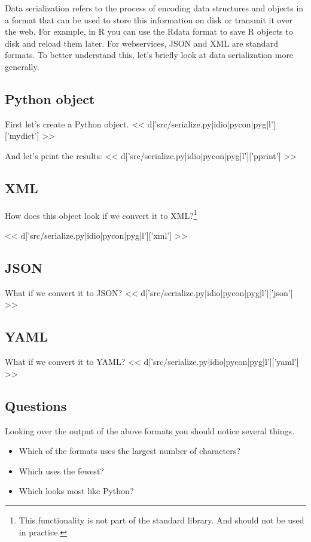 Data serialization refers to the process of encoding data structures and
objects in a format that can be used to store this information on disk or
transmit it over the web.  For example, in R you can use the Rdata format to
save R objects to disk and reload them later.  For webservices, JSON and XML
are standard formats.  To better understand this, let's briefly look at data
serialization more generally.

\subsection*{Python object}
First let's create a Python object.
<< d['src/serialize.py|idio|pycon|pyg|l']['mydict'] >>

And let's print the results:
<< d['src/serialize.py|idio|pycon|pyg|l']['pprint'] >>

\subsection*{XML}

How does this object look if we convert it to XML?\footnote{This functionality
is not part of the standard library.  And should not be used in practice.}

<< d['src/serialize.py|idio|pycon|pyg|l']['xml'] >>

\subsection*{JSON}
What if we convert it to JSON?
<< d['src/serialize.py|idio|pycon|pyg|l']['json'] >>

\subsection*{YAML}
What if we convert it to YAML?
<< d['src/serialize.py|idio|pycon|pyg|l']['yaml'] >>

\subsection*{Questions}
Looking over the output of the above formats you should notice several things.

\begin{itemize}
\item Which of the formats uses the largest number of characters?
\item Which uses the fewest?
\item Which looks most like Python?
\end{itemize}

